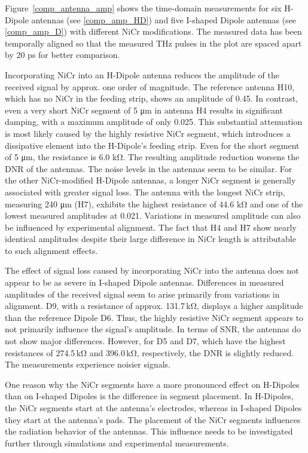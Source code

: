 Figure~\ref{comp_antenna_amp} shows the time-domain measurements for six H-Dipole antennas (see \ref{comp_amp_HD}) and five I-shaped Dipole antennas (see \ref{comp_amp_D}) with different NiCr modifications. The measured data has been temporally aligned so that the measured THz pulses in the plot are spaced apart by \num{20} \si{\pico \s} for better comparison.  

Incorporating NiCr into an H-Dipole antenna reduces the amplitude of the received signal by approx. one order of magnitude. The reference antenna H10, which has no NiCr in the feeding strip, shows an amplitude of \num{0.45}. In contrast, even a very short NiCr segment of \num{5} \si{\micro\meter} in antenna H4 results in significant damping, with a maximum amplitude of only \num{0.025}. This substantial attenuation is most likely caused by the highly resistive NiCr segment, which introduces a dissipative element into the H-Dipole’s feeding strip. Even for the short segment of \num{5} \si{\micro \meter}, the resistance is \num{6.0} \si{\kilo \ohm}. The resulting amplitude reduction worsens the DNR of the antennas. The noise levels in the antennas seem to be similar. For the other NiCr-modified H-Dipole antennas, a longer NiCr segment is generally associated with greater signal loss. The antenna with the longest NiCr strip, measuring \num{240} \si{\micro\meter} (H7), exhibits the highest resistance of \num{44.6} \si{\kilo\ohm} and one of the lowest measured amplitudes at \num{0.021}. Variations in measured amplitude can also be influenced by experimental alignment. The fact that H4 and H7 show nearly identical amplitudes despite their large difference in NiCr length is attributable to such alignment effects.

The effect of signal loss caused by incorporating NiCr into the antenna does not appear to be as severe in I-shaped Dipole antennas. Differences in measured amplitudes of the received signal seem to arise primarily from variations in alignment. D9, with a resistance of approx. \num{131.7}\,\si{\kilo \ohm}, displays a higher amplitude than the reference Dipole D6. Thus, the highly resistive NiCr segment appears to not primarily influence the signal's amplitude. In terms of SNR, the antennas do not show major differences. However, for D5 and D7, which have the highest resistances of \num{274.5}\,\si{\kilo \ohm} and \num{396.0}\,\si{\kilo \ohm}, respectively, the DNR is slightly reduced. The measurements experience noisier signals. 

One reason why the NiCr segments have a more pronounced effect on H-Dipoles than on I-shaped Dipoles is the difference in segment placement. In H-Dipoles, the NiCr segments start at the antenna’s electrodes, whereas in I-shaped Dipoles they start at the antenna’s pads. The placement of the NiCr segments influences the radiation behavior of the antennas. This influence needs to be investigated further through simulations and experimental measurements.

